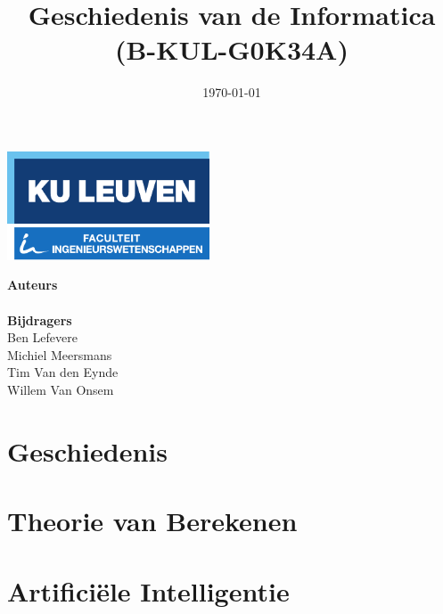 \documentclass[11pt]{article}
\title{Geschiedenis van de Informatica \\ (B-KUL-G0K34A)}
\date{\today}
\author{\theauthors}
\newcommand{\thecontributors}{Ben Lefevere \\ Michiel Meersmans \\ Tim Van den Eynde \\  Willem Van Onsem }
\theoremstyle{definition}
\begin{document}

\begin{titlepage}

\thispagestyle{empty}

\begin{minipage}{\textwidth}
	\includegraphics[width=60mm]{logokuleng.pdf}
\end{minipage}

\vspace{40mm}

\begin{minipage}{\textwidth}
	\Huge
	\sffamily
	\thetitle
\end{minipage}

\vspace{50mm}

\hfill
\begin{minipage}{0.3\textwidth}
\begin{flushright}
	\Large
	\sffamily
	\textbf{Auteurs} \\
	\theauthor
	\vspace{10mm} \\
	\textbf{Bijdragers} \\
	\thecontributors
\end{flushright}
\end{minipage}
\vfill
\end{titlepage}

\newpage

\tableofcontents

\newpage

\section{Geschiedenis}




\section{Theorie van Berekenen}


\section{Artifici\"ele Intelligentie}

\end{document}
